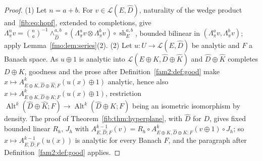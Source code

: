 \documentclass[11pt]{amsart}
\theoremstyle{definition}
\theoremstyle{remark}
\numberwithin{equation}{section}
\newcommand{\cL}{\mathcal L}
\newcommand{\Alt}{\operatorname{Alt}}
\newcommand{\Kh}{\widehat K}
\theoremstyle{plain}
\theoremstyle{definition}
\theoremstyle{plain}
\newcommand{\sh}{\operatorname{sh}}
\begin{document}
\begin{proof}
(1) Let $n=a+b$. For $v\in\cL(E,\widehat D)$, naturality of the wedge product and~\eqref{fib:eq:hopf}, extended to
completions, give $\Lambda^n_\pi v=\binom na^{-1}\wedge^{a,b}_{\widehat D}\circ(\Lambda^a_\pi v\otimes\Lambda^b_\pi v)\circ
\sh^{a,b}_E$, bounded bilinear in $(\Lambda^a_\pi v,\Lambda^b_\pi v)$; apply Lemma~\ref{fmo:lem:series}(2).
(2) Let $u\colon U\to\cL(E,\widehat D)$ be analytic and $F$ a Banach space. As $u\oplus1$ is analytic into
$\cL(E\oplus K,\widehat D\oplus\Kh)$ and $\widehat D\oplus\Kh$ completes $D\oplus K$, goodness and the prose after
Definition~\ref{fam2:def:good} make $x\mapsto A^k_{E\oplus K,\widehat D\oplus\Kh;F}(u(x)\oplus1)$ analytic, hence also
$x\mapsto A^k_{E\oplus K,\widehat D\oplus K;F}(u(x)\oplus1)$, restriction $\Alt^k(\widehat D\oplus\Kh;F)\to
\Alt^k(\widehat D\oplus K;F)$ being an isometric isomorphism by density. The proof of Theorem~\ref{fib:thm:hyperplane},
with $\widehat D$ for $D$, gives
fixed bounded linear $R_h$, $J_h$ with $A^{k-1}_{E,\widehat D;F}(v)=R_h\circ A^k_{E\oplus K,\widehat D\oplus K;F}(v\oplus1)
\circ J_h$; so $x\mapsto A^{k-1}_{E,\widehat D;F}(u(x))$ is analytic for every Banach $F$, and the paragraph after
Definition~\ref{fam2:def:good} applies.
\end{proof}
\end{document}

